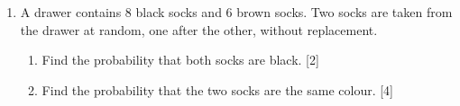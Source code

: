 \documentclass[12pt, twoside]{article}
\begin{document}
\begin{enumerate}[itemsep=0.1cm]
\newpage

\item A drawer contains 8 black socks and 6 brown socks. Two socks are
taken from the drawer at random, one after the other, without replacement.

\begin{enumerate}[itemsep=0.25cm]
  \item Find the probability that both socks are black. \hfill [2]
  \item Find the probability that the two socks are the same colour. \hfill [4]
\end{enumerate}


\end{enumerate}
\end{document}
